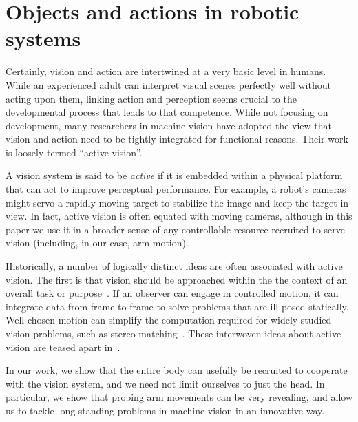 \section{Objects and actions in robotic systems}

Certainly, vision and action are intertwined at a very basic level in
humans.  While an experienced adult can interpret visual scenes
perfectly well without acting upon them, linking action and perception
seems crucial to the developmental process that leads to that
competence.  While not focusing on development, many researchers in
machine vision have adopted the view that vision and action need to be
tightly integrated for functional reasons.  Their work is loosely
termed ``active vision''.

A vision system is said to be {\em active} if it is embedded within a
physical platform that can act to improve perceptual performance.  For
example, a robot's cameras might servo a rapidly moving target to
stabilize the image and keep the target in view.  In fact, active
vision is often equated with moving cameras, although in this paper we
use it in a broader sense of any controllable resource recruited to
serve vision (including, in our case, arm motion).

Historically, a number of logically distinct ideas are often
associated with active vision.  The first is that vision should be
approached within the the context of an overall task or
purpose~\cite{aloimonos87active}.  If an observer can engage in
controlled motion, it can integrate data from frame to frame to solve
problems that are ill-posed statically.  Well-chosen motion can
simplify the computation required for widely studied vision problems,
such as stereo matching~\cite{bajcsy88active,ballard91animate}.  These
interwoven ideas about active vision are teased apart
in~\cite{tarr94computational}.  

In our work, we show that the entire body can usefully be recruited to
cooperate with the vision system, and we need not limit ourselves to
just the head.  In particular, we show that probing arm movements
can be very revealing, and allow us to tackle long-standing problems 
in machine vision in an innovative way.

